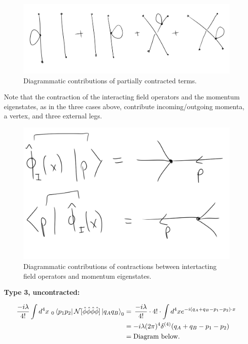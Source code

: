 \begin{figure}[H]
	\centering
	\includegraphics[scale=0.4]{partcont.png}
	\caption{Diagrammatic contributions of partially contracted terms.}
\end{figure}

\noindent Note that the contraction of the interacting field operators and the momentum eigenstates, as in the three cases above, contribute incoming/outgoing momenta, a vertex, and three external legs.

\begin{figure}[H]
	\centering
	\includegraphics[scale=0.3]{opstatecont.png}
	\caption{Diagrammatic contributions of contractions between intertacting field operators and momentum eigenstates.}
\end{figure}

\noindent \textbf{Type 3, uncontracted:} 

\begin{align*}
\frac{-i\lambda}{4!} \int d^4 x \,\,_0\bra{p_1 p_2} \mathcal{N}[\hat{\phi} \hat{\phi} \hat{\phi} \hat{\phi}] \ket{q_A q_B}_0 &= \, \frac{-i\lambda}{4!} \cdot 4! \cdot \int d^4 x e^{-i(q_A + q_B - p_1 - p_2) \cdot x} \\
&= -i \lambda (2 \pi)^4 \delta^{(4)} (q_A + q_B - p_1 - p_2) \\
&= \text{Diagram below.}
\end{align*}

